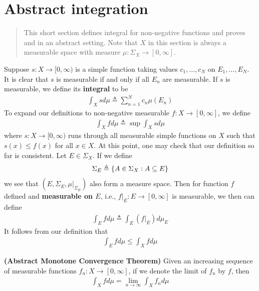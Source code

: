 \documentclass{report}
\begin{document}
\section{Abstract integration} 
\label{Ai}
\begin{abstract}
This short section defines integral for non-negative functions and proves  and  in an abstract setting.  Note that $X$ in this section is always a measurable space with measure $\mu:\Sigma_X\rightarrow [0,\infty]$. 
\end{abstract}
\begin{mdframed}
Suppose $s:X\rightarrow [0,\infty)$ is a simple function taking values $c_1,\dots ,c_N$ on $E_1,\dots ,E_N$. It is clear that $s$ is measurable if and only if all $E_n$ are measurable. If $s$ is measurable, we define its \textbf{integral} to be 
\begin{align*}
\int_X s d\mu \triangleq \sum_{n=1}^N c_n \mu (E_n)
\end{align*}
To expand our definitions to non-negative measurable $f:X\rightarrow [0,\infty]$, we define  
\begin{align*}
  \int_X fd\mu \triangleq \sup \int_X sd\mu
\end{align*}
where $s:X\rightarrow [0,\infty)$ runs through all measurable simple functions on $X$ such that $s(x)\leq f(x)$ for all $x\in X$. At this point, one may check that our definition so far is consistent.  
Let $E\in \Sigma_X$. If we define 
\begin{align*}
\Sigma_E\triangleq \{ A\in \Sigma_X: A \subseteq E \}
\end{align*}
we see that $(E,\Sigma_E, \mu |_{\Sigma_E})$ also form a measure space. Then for function $f$ defined and \textbf{measurable on $E$}, i.e., $f|_E:E\rightarrow [0,\infty]$ is measurable, we then can define  
\begin{align*}
\int_E fd\mu\triangleq \int_E (f|_E)d\mu_E
\end{align*}
It follows from our definition that 
 \begin{align*}
\int_E fd\mu \leq \int_X fd\mu
\end{align*}
\end{mdframed}
\begin{theorem}
\label{MCTn}
\textbf{(Abstract Monotone Convergence Theorem)} Given an increasing sequence of measurable functions $f_n:X\rightarrow [0,\infty]$, if we denote the limit of $f_n$ by $f$, then 
\begin{align*}
  \int_X fd\mu = \lim_{n\to \infty}\int_X f_n d\mu
\end{align*}
\end{theorem}
\end{document}
